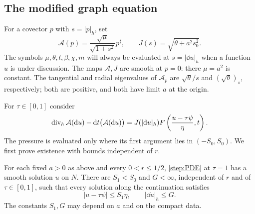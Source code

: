 \subsection{The modified graph equation}

For a covector $p$ with $s=|p|_h$, set
\[
 \mathcal A(p)=\frac{\sqrt\mu}{\sqrt{1+s^2}}p^\sharp,
 \qquad J(s)=\sqrt{\theta+a^2s_0^2}.
\]
The symbols $\mu,\theta,l,\beta,\chi,m$ will always be evaluated at
$s=|\dd u|_h$ when a function $u$ is under discussion.  The maps
$\mathcal A,J$ are smooth at $p=0$: there $\mu=a^2$ is constant.
The tangential and radial eigenvalues of $\mathcal A_p$ are
$\sqrt\theta/s$ and $(\sqrt\theta)_s$, respectively; both are positive,
and both have limit $a$ at the origin.

For $\tau\in[0,1]$ consider
\begin{equation}\label{step:PDE}
 \operatorname{div}_h\mathcal A(\mathrm d u)-\mathrm d t\bigl(\mathcal A(\mathrm d u)\bigr)
 =J(|\mathrm d u|_h)F\left(\frac{u-\tau\psi}{\eta},t\right).
\end{equation}
The pressure is evaluated only where its first argument lies in
$(-S_0,S_0)$.  We first prove existence with bounds independent of $r$.

\begin{lemma}\label{step:existence}
For each fixed $a>0$ as above and every $0<r\le1/2$,
\cref{step:PDE} at $\tau=1$ has a smooth solution $u$ on $N$.
There are $S_1<S_0$ and $G<\infty$, independent of $r$ and of
$\tau\in[0,1]$, such that every solution along the continuation satisfies
\begin{equation}\label{step:C01}
 |u-\tau\psi|\le S_1\eta,\qquad |\dd u|_h\le G.
\end{equation}
The constants $S_1,G$ may depend on $a$ and on the compact data.
\end{lemma}

